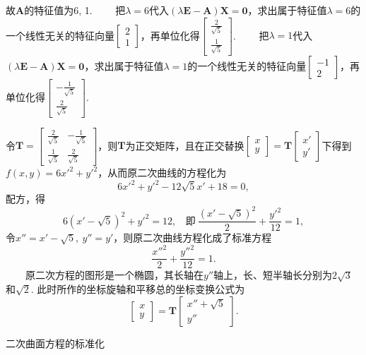 \documentclass[compress,mathserif,cjk]{beamer}
\theoremstyle{remark}
\numberwithin{equation}{section}
\begin{document}
\begin{CJK}{UTF8}{gbsn}
\begin{frame}
故$\bm A$的特征值为6, 1.
\vskip 2pt
\ \ \ \ 把$\lambda=6$代入$(\lambda\bm E-\bm A)\bm X=\bm 0$，求出属于特征值$\lambda=6$的一个线性无关的特征向量$\left[\begin{matrix}2\\1\end{matrix}\right]$，再单位化得$\left[\begin{matrix}\frac{2}{\sqrt5}\\\frac{1}{\sqrt5}\end{matrix}\right]$.
\vskip 2pt
\ \ \ \ 把$\lambda=1$代入$(\lambda\bm E-\bm A)\bm X=\bm 0$，求出属于特征值$\lambda=1$的一个线性无关的特征向量$\left[\begin{matrix}-1\\2\end{matrix}\right]$，再单位化得$\left[\begin{matrix}-\frac{1}{\sqrt5}\\\frac{2}{\sqrt5}\end{matrix}\right]$.
\end{frame}
\begin{frame}\small
令$\bm T=\left[\begin{matrix}\frac{2}{\sqrt5}&-\frac{1}{\sqrt5}\\\frac{1}{\sqrt5}&\frac{2}{\sqrt5}\end{matrix}\right]$，则$\bm T$为正交矩阵，且在正交替换$\left[\begin{matrix}x\\y\end{matrix}\right]=\bm T\left[\begin{matrix}x'\\y'\end{matrix}\right]$下得到$f(x,y)=6x'^2+y'^2$，从而原二次曲线的方程化为
$$6x'^2+y'^2-12\sqrt5 x'+18=0,$$
配方，得
$$6(x'-\sqrt5)^2+y'^2=12,~~~~\mbox{即}~\frac{(x'-\sqrt5)^2}2+\frac{y'^2}{12}=1,$$
令$x''=x'-\sqrt5,~y''=y'$，则原二次曲线方程化成了标准方程
$$\frac{x''^2}2+\frac{y''^2}{12}=1.$$
\pause\ \ \ \ 原二次方程的图形是一个椭圆，其长轴在$y''$轴上，长、短半轴长分别为$2\sqrt3$和$\sqrt2$. 此时所作的坐标旋轴和平移总的坐标变换公式为
$$\left[\begin{matrix}x\\y\end{matrix}\right]=\bm T\left[\begin{matrix}x''+\sqrt5\\y''\end{matrix}\right].$$
\end{frame}
\begin{frame}{二次曲面方程的标准化}\small

\end{frame}
\end{CJK}
\end{document}
